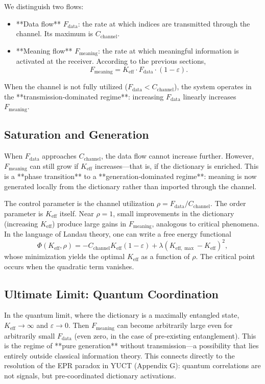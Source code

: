 \documentclass[12pt,a4paper]{article}
\theoremstyle{remark}
\newcommand{\Keff}{K_{\mathrm{eff}}}
\newcommand{\Keffmax}{K_{\mathrm{eff},\max}}
\begin{document}
	We distinguish two flows:
	\begin{itemize}
		\item **Data flow** $F_{\text{data}}$: the rate at which indices are transmitted through the channel. Its maximum is $C_{\text{channel}}$.
		\item **Meaning flow** $F_{\text{meaning}}$: the rate at which meaningful information is activated at the receiver. According to the previous sections,
		\[
		F_{\text{meaning}} = \Keff \cdot F_{\text{data}} \cdot (1 - \varepsilon).
		\]
	\end{itemize}
	
	When the channel is not fully utilized ($F_{\text{data}} < C_{\text{channel}}$), the system operates in the **transmission‑dominated regime**: increasing $F_{\text{data}}$ linearly increases $F_{\text{meaning}}$.
	
	\subsection{Saturation and Generation}
	
	When $F_{\text{data}}$ approaches $C_{\text{channel}}$, the data flow cannot increase further. However, $F_{\text{meaning}}$ can still grow if $\Keff$ increases—that is, if the dictionary is enriched. This is a **phase transition** to a **generation‑dominated regime**: meaning is now generated locally from the dictionary rather than imported through the channel.
	
	The control parameter is the channel utilization $\rho = F_{\text{data}} / C_{\text{channel}}$. The order parameter is $\Keff$ itself. Near $\rho = 1$, small improvements in the dictionary (increasing $\Keff$) produce large gains in $F_{\text{meaning}}$, analogous to critical phenomena. In the language of Landau theory, one can write a free energy functional
	\[
	\Phi(\Keff, \rho) = -C_{\text{channel}} \Keff (1 - \varepsilon) + \lambda (\Keffmax - \Keff)^2,
	\]
	whose minimization yields the optimal $\Keff$ as a function of $\rho$. The critical point occurs when the quadratic term vanishes.
	
	\subsection{Ultimate Limit: Quantum Coordination}
	
	In the quantum limit, where the dictionary is a maximally entangled state, $\Keff \to \infty$ and $\varepsilon \to 0$. Then $F_{\text{meaning}}$ can become arbitrarily large even for arbitrarily small $F_{\text{data}}$ (even zero, in the case of pre‑existing entanglement). This is the regime of **pure generation** without transmission—a possibility that lies entirely outside classical information theory. This connects directly to the resolution of the EPR paradox in YUCT (Appendix G): quantum correlations are not signals, but pre‑coordinated dictionary activations.
	
\end{document}
